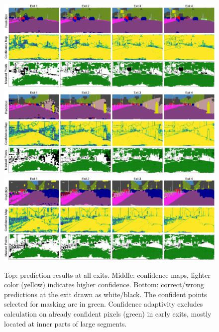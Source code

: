 \begin{figure}[htbp]
\includegraphics[width=\textwidth]{images/vis_supp/visualize_final_frankfurt_000000_017476.png}
\includegraphics[width=\textwidth]{images/vis_supp/visualize_final_frankfurt_000001_005184.png}
\includegraphics[width=\textwidth]{images/vis_supp/visualize_final_frankfurt_000001_028335.png}
\caption{%
Top: prediction results at all exits.
Middle: confidence maps, lighter color (yellow) indicates higher confidence.
Bottom: correct/wrong predictions at the exit drawn as white/black.
The confident points selected for masking are in green.
Confidence adaptivity excludes calculation on already confident pixels (green) in early exits, mostly located at inner parts of large segments.}
\label{fig:vis1}
\end{figure}

